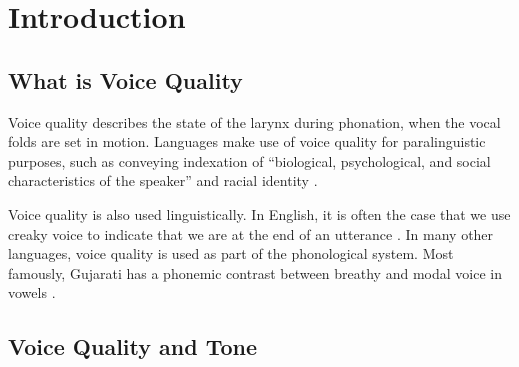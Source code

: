 
\chapter{Introduction} \label{chap:introduction}


\section{What is Voice Quality} \label{sec:voice_quality}
Voice quality describes the state of the larynx during phonation, when the vocal folds are set in motion. Languages make use of voice quality for paralinguistic purposes, such as conveying indexation of ``biological, psychological, and social characteristics of the speaker'' \citep{laverVoiceQualityIndexical1968} and racial identity \citep{podesvaStanceWindowLanguageRace2016}. 

Voice quality is also used linguistically. In English, it is often the case that we use creaky voice to indicate that we are at the end of an utterance \citep[e.g.,][]{garellekProductionPerceptionGlottal2013}. In many other languages, voice quality is used as part of the phonological system. Most famously, Gujarati has a phonemic contrast between breathy and modal voice in vowels \citep[e.g.,][]{fischer-jorgensenPhoneticAnalysisBreathy1968,espositoContrastiveBreathinessConsonants2012, khanPhoneticsContrastivePhonation2012,espositoDistinguishingBreathyConsonants2019}. 

\citet{espositoCrosslinguisticPatternsPhonation2020}

\section{Voice Quality and Tone} \label{sec:voice_quality_and_tone}

